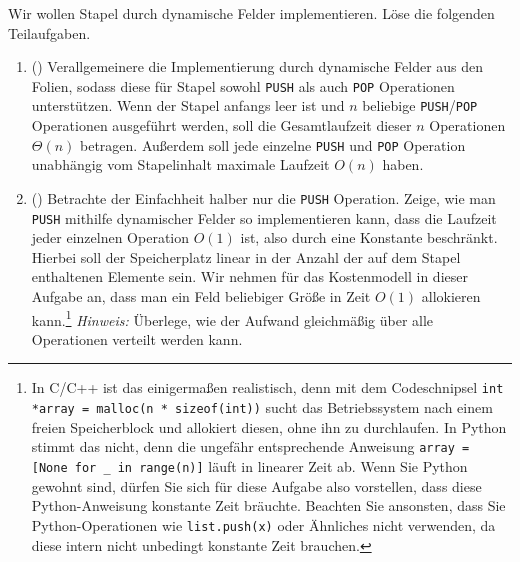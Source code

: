 \documentclass{uebung_cs}
\begin{document}
\begin{aufgabe}
	Wir wollen Stapel durch dynamische Felder implementieren.
	Löse die folgenden Teilaufgaben.
	\begin{enumerate}
		\item (\hard) Verallgemeinere die Implementierung durch dynamische Felder aus den Folien, sodass diese für Stapel sowohl \texttt{PUSH} als auch \texttt{POP} Operationen unterstützen.
		Wenn der Stapel anfangs leer ist und $n$ beliebige \texttt{PUSH}/\texttt{POP} Operationen ausgeführt werden, soll die Gesamtlaufzeit dieser $n$ Operationen $\Theta(n)$ betragen. Außerdem soll jede einzelne \texttt{PUSH} und \texttt{POP} Operation unabhängig vom Stapelinhalt maximale Laufzeit $O(n)$ haben.
		\item (\veryhard) Betrachte der Einfachheit halber nur die \texttt{PUSH} Operation.
		Zeige, wie man \texttt{PUSH} mithilfe dynamischer Felder so implementieren kann, dass die Laufzeit jeder einzelnen Operation $O(1)$ ist, also durch eine Konstante beschränkt.
		Hierbei soll der Speicherplatz linear in der Anzahl der auf dem Stapel enthaltenen Elemente sein.
		Wir nehmen für das Kostenmodell in dieser Aufgabe an, dass man ein Feld beliebiger Größe in Zeit $O(1)$ allokieren kann.\footnote{In C/C++ ist das einigermaßen realistisch, denn mit dem Codeschnipsel \texttt{int *array = malloc(n * sizeof(int))} sucht das Betriebssystem nach einem freien Speicherblock und allokiert diesen, ohne ihn zu durchlaufen. In Python stimmt das nicht, denn die ungefähr entsprechende Anweisung \texttt{array = [None for \_ in range(n)]} läuft in linearer Zeit ab. Wenn Sie Python gewohnt sind, dürfen Sie sich für diese Aufgabe also vorstellen, dass diese Python-Anweisung konstante Zeit bräuchte. Beachten Sie ansonsten, dass Sie Python-Operationen wie \texttt{list.push(x)} oder Ähnliches nicht verwenden, da diese intern nicht unbedingt konstante Zeit brauchen.}
		\textit{Hinweis:} Überlege, wie der Aufwand gleichmäßig über alle Operationen verteilt werden kann. 
	\end{enumerate}
\end{aufgabe}
\end{document}
